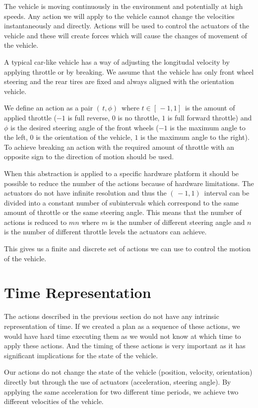 The vehicle is moving continuously in the environment and potentially at high speeds. Any action we will apply to the vehicle cannot change the velocities instantaneously and directly. Actions will be used to control the actuators of the vehicle and these will create forces which will cause the changes of movement of the vehicle.

A typical car-like vehicle has a way of adjusting the longitudal velocity by applying throttle or by breaking. We assume that the vehicle has only front wheel steering and the rear tires are fixed and always aligned with the orientation vehicle.

We define an action as a pair $( \, t, \phi ) \,$ where $t \in [ \, -1, 1 ] \,$ is the amount of applied throttle ($-1$ is full reverse, $0$ is no throttle, $1$ is full forward throttle) and $\phi$ is the desired steering angle of the front wheels ($-1$ is the maximum angle to the left, $0$ is the orientation of the vehicle, $1$ is the maximum angle to the right). To achieve breaking an action with the required amount of throttle with an opposite sign to the direction of motion should be used.

When this abstraction is applied to a specific hardware platform it should be possible to reduce the number of the actions because of hardware limitations. The actuators do not have infinite resolution and thus the $( \, -1, 1 ) \,$ interval can be divided into a constant number of subintervals which correspond to the same amount of throttle or the same steering angle. This means that the number of actions is reduced to $mn$ where $m$ is the number of different steering angle and $n$ is the number of different throttle levels the actuators can achieve.

This gives us a finite and discrete set of actions we can use to control the motion of the vehicle.

\section{Time Representation}

The actions described in the previous section do not have any intrinsic representation of time. If we created a plan as a sequence of these actions, we would have hard time executing them as we would not know at which time to apply these actions. And the timing of these actions is very important as it has significant implications for the state of the vehicle.

Our actions do not change the state of the vehicle (position, velocity, orientation) directly but through the use of actuators (acceleration, steering angle). By applying the same acceleration for two different time periods, we achieve two different velocities of the vehicle.

